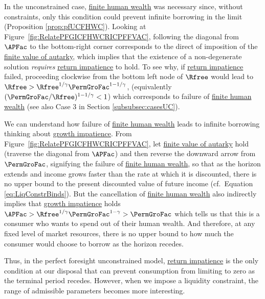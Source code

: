 \documentclass[BufferStockTheory]{subfiles}
\begin{document}
In the unconstrained case, \hyperlink{FHWC}{finite human wealth} was necessary since, without constraints, only  this condition could prevent infinite borrowing in the limit (Proposition \ref{prop:pfUCFHWC}).
Looking at Figure~\ref{fig:RelatePFGICFHWCRICPFFVAC}, following the diagonal from $\APFac$ to the bottom-right corner corresponds to the direct of imposition of the \hyperlink{PFFVAC}{finite value of autarky}, which implies that the existence of a non-degenerate solution \textit{requires} \hyperlink{RIC}{return impatience} to hold.
To see why, if \hyperlink{RIC}{return impatience} failed, proceeding clockwise from the bottom left node of $\Rfree$ would lead to $\Rfree> \Rfree^{1/\CRRA}\PermGroFac^{1-1/\CRRA}$, (equivalently $(\PermGroFac/\Rfree)^{1-{1/\CRRA}}<1$) which corresponds to failure of \hyperlink{FHWC}{finite human wealth} (see also Case 3 in Section \ref{subsubsec:casesUC}).


We can understand how failure of \hyperlink{FHWC}{finite human wealth} leads to infinite borrowing thinking about \hyperlink{GIC}{growth impatience}.
From Figure~\ref{fig:RelatePFGICFHWCRICPFFVAC}, let \hyperlink{PFFVAC}{finite value of autarky} hold (traverse the diagonal from $\APFac$)  and then reverse the downward arrow from $\PermGroFac$, signifying the failure of \hyperlink{FHWC}{finite human wealth}, so that as the horizon extends and income grows faster than the rate at which it is discounted, there is no upper bound to the present discounted value of future income (cf.\ Equation \eqref{eq:LiqConstrBinds}).
But the cancellation of \hyperlink{FHWC}{finite human wealth} also indirectly implies that \hyperlink{GIC}{growth impatience} holds $\APFac > \Rfree^{1/\CRRA}\PermGroFac^{1-\CRRA} > \PermGroFac$ which tells us that this is a consumer who wants to spend out of their human wealth.
And therefore, at any fixed level of market resources, there is no upper bound to how much the consumer would choose to borrow as the horizon recedes.

Thus, in the perfect foresight unconstrained model, \hyperlink{RIC}{return impatience} is the only condition at our disposal that can prevent consumption from limiting to zero as the terminal period recedes.
However, when we impose a liquidity constraint, the range of admissible parameters becomes more interesting.
\end{document}
